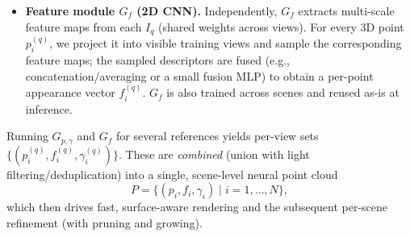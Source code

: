 \begin{enrichment}
\begin{enrichment}
\begin{enrichment}
\begin{itemize}
\begin{enumerate}
                \item \emph{Confidence from $P_q$.} Assign each 3D point a confidence by sampling the \emph{depth probability} at its inferred depth:
                \[
                \gamma_i^{(q)}\approx P_q\!\big(u_i,\,v_i,\,D_q(u_i,v_i)\big)\in[0,1],
                \]
                using \emph{tri-linear interpolation} in $(u,v,d)$ to handle non-integer coordinates.
                \emph{Intuition:} tri-linear sampling blends the eight neighboring grid values to evaluate $P_q$ at the continuous location $(u_i,v_i,d_i)$.
                If $P_q(u_i,v_i,\cdot)$ is \emph{peaked} near $d_i$, the pixel’s multi-view evidence strongly agrees there, so $\gamma_i^{(q)}$ is large; if it is \emph{flat} or multi-modal, the depth is uncertain and $\gamma_i^{(q)}$ is small.
            \end{enumerate}
            \emph{Generalization.} Trained once across diverse scenes, $G_{p,\gamma}$ produces dense geometry and uncertainty-aware confidences for a \emph{new} scene with a single forward pass (no per-scene retraining), yielding a fast and reliable geometric scaffold for Point-NeRF.
            
            \item \textbf{Feature module $G_f$ (2D CNN).}
            Independently, $G_f$ extracts multi-scale feature maps from each $I_q$ (shared weights across views). For every 3D point $p_i^{(q)}$, we project it into visible training views and sample the corresponding feature maps; the sampled descriptors are fused (e.g., concatenation/averaging or a small fusion MLP) to obtain a per-point appearance vector $f_i^{(q)}$. $G_f$ is also trained across scenes and reused as-is at inference.
        \end{itemize}
        
        \noindent
        Running $G_{p,\gamma}$ and $G_f$ for several references yields per-view sets $\{(p_i^{(q)},f_i^{(q)},\gamma_i^{(q)})\}$. These are \emph{combined} (union with light filtering/deduplication) into a single, scene-level neural point cloud
        \[
        P=\{(p_i,f_i,\gamma_i)\mid i=1,\dots,N\},
        \]
        which then drives fast, surface-aware rendering and the subsequent per-scene refinement (with pruning and growing).
        

\end{enrichment}
\end{enrichment}
\end{enrichment}
